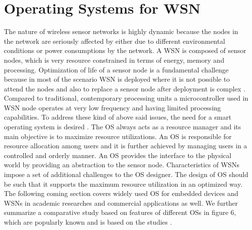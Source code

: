 \documentclass[12pt,journal,communications surveys and tutorials]{IEEEtran}
\begin{document}
\section{Operating Systems for WSN}
The nature of wireless sensor networks is highly dynamic because the nodes in the network are seriously affected by either due to different environmental conditions or power consumptions by the network. A WSN is composed of sensor nodes, which is very resource constrained in terms of energy, memory and processing. Optimization of life of a sensor node is a fundamental challenge because in most of the scenario WSN is deployed where it is not possible to attend the nodes and also to replace a sensor node after deployment is complex \cite{farooq2011operating}. Compared to traditional, contemporary processing units a microcontroller used in WSN node operates at very low frequency and having limited processing capabilities. To address these kind of above said issues, the need for a smart operating system is desired \cite{yick2008wireless}. The OS always acts as a resource manager and its main objective is to maximize resource utilizations. An OS is responsible for resource allocation among users and it is further achieved by managing users in a controlled and orderly manner. An OS provides the interface to the physical world by providing an abstraction to the sensor node.  Characteristics of WSNs impose a set of additional challenges to the OS designer. The design of OS should be such that it supports the maximum resource utilization in an optimized way.   The following coming section covers widely used OS for embedded devices and WSNs in academic researches and commercial applications as well. We further summarize a comparative study based on features of different OSs in figure 6, which are popularly known and is based on the studies \cite{farooq2011operating,phani2009operating}.
\end{document}
